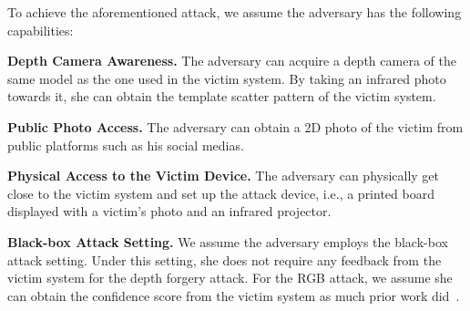 To achieve the aforementioned attack, we assume the adversary has the following capabilities:

\textbf{Depth Camera Awareness.}
The adversary can acquire a depth camera of the same model as the one used in the victim system. By taking an infrared photo towards it, she can obtain the template scatter pattern of the victim system.


\textbf{Public Photo Access.}
The adversary can obtain a  2D photo of the victim from  public platforms such as his social medias.

\textbf{Physical Access to the Victim Device.} The adversary can physically get close to the victim system and set up the attack device, i.e., a printed board displayed with a victim's photo and an infrared projector.


\textbf{Black-box Attack Setting.} 
We assume the adversary employs the black-box attack setting. Under this setting, she does not require any feedback from the victim system for the depth forgery attack. For the RGB attack, we assume she can obtain the  confidence score from the victim system as  much prior work did~\cite{guo2019simple}.



